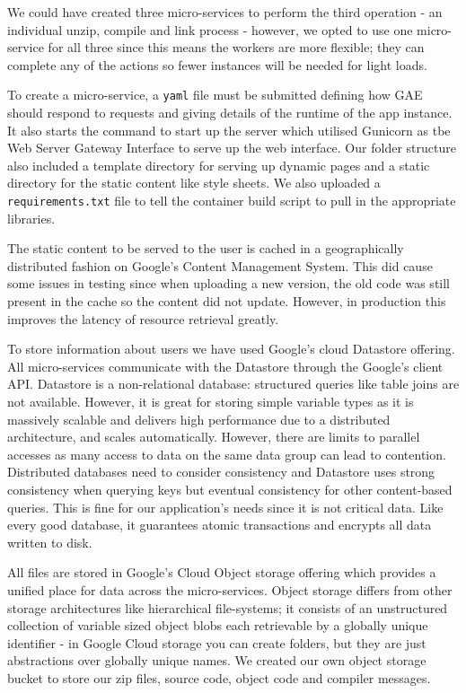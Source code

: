 \documentclass[conference]{IEEEtran}
\begin{document}
We could have created three micro-services to perform the third operation - an
individual unzip, compile and link process - however, we opted to use one
micro-service for all three since this means the workers are more flexible; they can complete any
of the actions so fewer instances will be needed for light loads.

To create a micro-service, a \texttt{yaml} file must be submitted defining
how GAE should respond to requests and giving details of the runtime of the
app instance. It also starts the command to start up the server which utilised
Gunicorn\cite{gunicorn} as tbe Web Server Gateway Interface to serve up
the web interface. Our folder structure also included a template directory for
serving up dynamic pages and a static directory for the static content like
style sheets. We also uploaded a \texttt{requirements.txt} file to tell the
container build script to pull in the appropriate libraries.

The static content to be served to the user is cached in a geographically
distributed fashion on Google's Content Management System. This did cause some
issues in testing since when uploading a new version, the old code was still
present in the cache so the content did not update. However, in production this
improves the latency of resource retrieval greatly.

To store information about users we have used Google's cloud
Datastore\cite{datastore} offering. All micro-services communicate with the
Datastore through the Google's client API. Datastore is a non-relational
database: structured queries like table joins are not available. However,
it is great for storing simple variable types as it is
massively scalable and delivers high performance due to a distributed
architecture, and scales automatically. However, there are limits to parallel
accesses as many access to data on the same data group can lead to contention.
Distributed databases need to consider consistency and Datastore uses
strong consistency when querying keys but eventual consistency for other
content-based queries. This is fine for our application's needs since it is not
critical data. Like every good database, it guarantees atomic transactions and
encrypts all data written to disk.

All files are stored in Google's Cloud Object storage offering\cite{storage}
which provides a unified place for data across the micro-services. Object
storage differs from other storage architectures like hierarchical file-systems;
it consists of an unstructured collection of variable sized object blobs each
retrievable by a globally unique identifier - in Google Cloud storage you can
create folders, but they are just abstractions over globally unique names.
We created our own object storage bucket to store our zip files, source code, 
object code and compiler messages.
\end{document}
